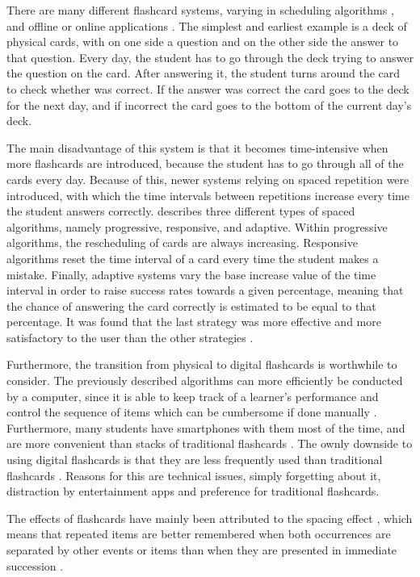 There are many different flashcard systems, varying in scheduling algorithms \cite{microlearning}, and offline or online applications \cite{nakata}. The simplest and earliest example is a deck of physical cards, with on one side a question and on the other side the answer to that question. Every day, the student has to go through the deck trying to answer the question on the card. After answering it, the student turns around the card to check whether was correct. If the answer was correct the card goes to the deck for the next day, and if incorrect the card goes to the bottom of the current day's deck.

The main disadvantage of this system is that it becomes time-intensive when more flashcards are introduced, because the student has to go through all of the cards every day. Because of this, newer systems relying on spaced repetition were introduced, with which the time intervals between repetitions increase every time the student answers correctly.  describes three different types of spaced algorithms, namely progressive, responsive, and adaptive. Within progressive algorithms, the rescheduling of cards are always increasing. Responsive algorithms reset the time interval of a card every time the student makes a mistake. Finally, adaptive systems vary the base increase value of the time interval in order to raise success rates towards a given percentage, meaning that the chance of answering the card correctly is estimated to be equal to that percentage. It was found that the last strategy was more effective and more satisfactory to the user than the other strategies \cite{microlearning}.

Furthermore, the transition from physical to digital flashcards is worthwhile to consider. The previously described algorithms can more efficiently be conducted by a computer, since it is able to keep track of a learner's performance and control the sequence of items which can be cumbersome if done manually \cite{nakata}. Furthermore, many students have smartphones with them most of the time, and are more convenient than stacks of traditional flashcards \cite{nakata}. The ownly downside to using digital flashcards is that they are less frequently used than traditional flashcards \cite{burgess}. Reasons for this are technical issues, simply forgetting about it, distraction by entertainment apps and preference for traditional flashcards.

The effects of flashcards have mainly been attributed to the spacing effect \cite{nakata, microlearning}, which means that repeated items are better remembered when both occurrences are separated by other events or items than when they are presented in immediate succession \cite{verkoeijen, logan, siegel, xue, karpicke2}.

